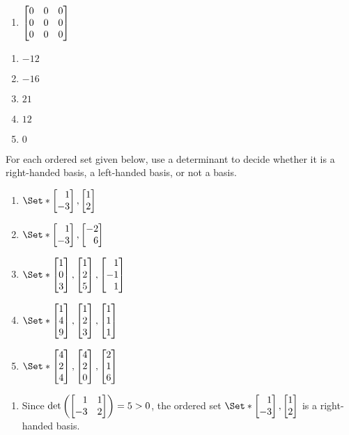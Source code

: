 \begin{exercises}
\begin{problist}
\begin{enumerate}
			\item $\mat{0 & 0 & 0 \\ 0 & 0 & 0 \\ 0 & 0 & 0}$
		\end{enumerate}
		\begin{solution}
			\begin{enumerate}
				\item $-12$

				\item $-16$

				\item $21$

				\item $12$

				\item $0$
			\end{enumerate}
		\end{solution}

		\prob For each ordered set given below, use a determinant to decide whether
		it is a right-handed basis, a left-handed basis, or not a basis.
		\begin{enumerate}
			\item $\Set*{\mat{1 \\ -3},\mat{1 \\ 2}}$

			\item $\Set*{\mat{1 \\ -3},\mat{-2 \\ 6}}$

			\item $\Set*{\mat{1 \\ 0 \\ 3},\mat{1 \\ 2 \\ 5},\mat{1 \\ -1 \\ 1}}$

			\item $\Set*{\mat{1 \\ 4 \\ 9},\mat{1 \\ 2 \\ 3},\mat{1 \\ 1 \\ 1}}$

			\item $\Set*{\mat{4 \\ 2 \\ 4},\mat{4 \\ 2 \\ 0},\mat{2 \\ 1 \\ 6}}$
		\end{enumerate}
		\begin{solution}
			\begin{enumerate}
				\item Since $\det\left(\mat{1 & 1 \\ -3 & 2}\right)=5>0$, the ordered set
					$\Set*{\mat{1 \\ -3},\mat{1 \\ 2}}$ is a right-handed basis.


\end{enumerate}
\end{solution}
\end{problist}
\end{exercises}
